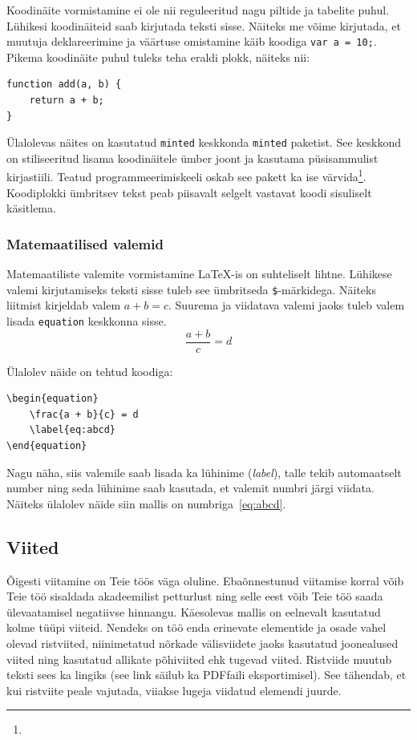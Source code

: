 Koodinäite vormistamine ei ole nii reguleeritud nagu piltide ja tabelite puhul. Lühikesi koodinäiteid saab kirjutada teksti sisse. Näiteks me võime kirjutada, et muutuja deklareerimine ja väärtuse omistamine käib koodiga \verb|var a = 10;|. Pikema koodinäite puhul tuleks teha eraldi plokk, näiteks nii:

\begin{verbatim}
function add(a, b) {
    return a + b;
}
\end{verbatim}

Ülalolevas näites on kasutatud \verb|minted| keskkonda \verb|minted| paketist. See keskkond on stiliseeritud lisama koodinäitele ümber joont ja kasutama püsisammulist kirjastiili. Teatud programmeerimiskeeli oskab see pakett ka ise värvida\footnote{}. Koodiplokki ümbritsev tekst peab piisavalt selgelt vastavat koodi sisuliselt käsitlema.

\subsubsection{Matemaatilised valemid}
Matemaatiliste valemite vormistamine LaTeX-is on suhteliselt lihtne. Lühikese valemi kirjutamiseks teksti sisse tuleb see ümbritseda \verb|$|-märkidega. Näiteks liitmist kirjeldab valem $a+b=c$. Suurema ja viidatava valemi jaoks tuleb valem lisada \verb|equation| keskkonna sisse.
\begin{equation}
    \frac{a + b}{c} = d
    \label{eq:abcd}
\end{equation}

Ülalolev näide on tehtud koodiga:
\begin{verbatim}
\begin{equation}
    \frac{a + b}{c} = d
    \label{eq:abcd}
\end{equation}
\end{verbatim}

Nagu näha, siis valemile saab lisada ka lühinime (\emph{label}), talle tekib automaatselt number ning seda lühinime saab kasutada, et valemit numbri järgi viidata. Näiteks ülalolev näide siin mallis on numbriga~\ref{eq:abcd}.

\subsection{Viited}
Õigesti viitamine on Teie töös väga oluline. Ebaõnnestunud viitamise korral võib Teie töö sisaldada akadeemilist petturlust ning selle eest võib Teie töö saada ülevaatamisel negatiivse hinnangu. Käesolevas mallis on eelnevalt kasutatud kolme tüüpi viiteid. Nendeks on töö enda erinevate elementide ja osade vahel olevad ristviited, niinimetatud nõrkade välisviidete jaoks kasutatud joonealused viited ning kasutatud allikate põhiviited ehk tugevad viited. Ristviide muutub teksti sees ka lingiks (see link säilub ka PDF{}faili eksportimisel). See tähendab, et kui ristviite peale vajutada, viiakse lugeja viidatud elemendi juurde.

